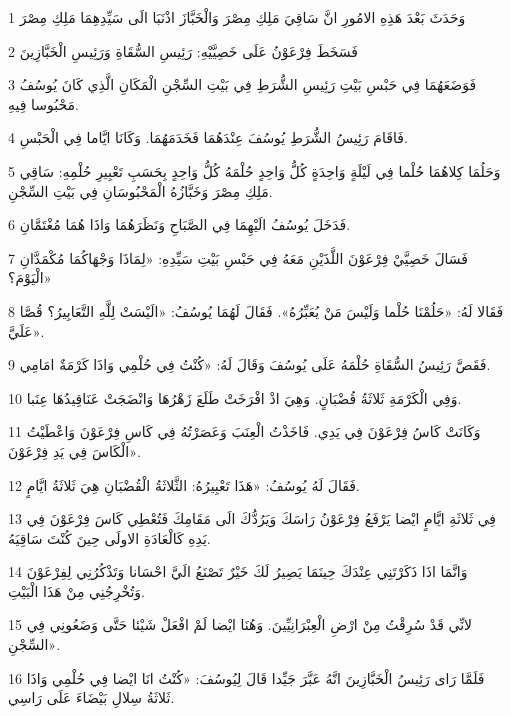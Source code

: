 \par 1 وَحَدَثَ بَعْدَ هَذِهِ الامُورِ انَّ سَاقِيَ مَلِكِ مِصْرَ وَالْخَبَّازَ اذْنَبَا الَى سَيِّدِهِمَا مَلِكِ مِصْرَ
\par 2 فَسَخَطَ فِرْعَوْنُ عَلَى خَصِيَّيْهِ: رَئِيسِ السُّقَاةِ وَرَئِيسِ الْخَبَّازِينَ
\par 3 فَوَضَعَهُمَا فِي حَبْسِ بَيْتِ رَئِيسِ الشُّرَطِ فِي بَيْتِ السِّجْنِ الْمَكَانِ الَّذِي كَانَ يُوسُفُ مَحْبُوسا فِيهِ.
\par 4 فَاقَامَ رَئِيسُ الشُّرَطِ يُوسُفَ عِنْدَهُمَا فَخَدَمَهُمَا. وَكَانَا ايَّاما فِي الْحَبْسِ.
\par 5 وَحَلُمَا كِلاهُمَا حُلْما فِي لَيْلَةٍ وَاحِدَةٍ كُلُّ وَاحِدٍ حُلْمَهُ كُلُّ وَاحِدٍ بِحَسَبِ تَعْبِيرِ حُلْمِهِ: سَاقِي مَلِكِ مِصْرَ وَخَبَّازُهُ الْمَحْبُوسَانِ فِي بَيْتِ السِّجْنِ.
\par 6 فَدَخَلَ يُوسُفُ الَيْهِمَا فِي الصَّبَاحِ وَنَظَرَهُمَا وَاذَا هُمَا مُغْتَمَّانِ.
\par 7 فَسَالَ خَصِيَّيْ فِرْعَوْنَ اللَّذَيْنِ مَعَهُ فِي حَبْسِ بَيْتِ سَيِّدِهِ: «لِمَاذَا وَجْهَاكُمَا مُكْمَدَّانِ الْيَوْمَ؟»
\par 8 فَقَالا لَهُ: «حَلُمْنَا حُلْما وَلَيْسَ مَنْ يُعَبِّرُهُ». فَقَالَ لَهُمَا يُوسُفُ: «الَيْسَتْ لِلَّهِ التَّعَابِيرُ؟ قُصَّا عَلَيَّ».
\par 9 فَقَصَّ رَئِيسُ السُّقَاةِ حُلْمَهُ عَلَى يُوسُفَ وَقَالَ لَهُ: «كُنْتُ فِي حُلْمِي وَاذَا كَرْمَةٌ امَامِي.
\par 10 وَفِي الْكَرْمَةِ ثَلاثَةُ قُضْبَانٍ. وَهِيَ اذْ افْرَخَتْ طَلَعَ زَهْرُهَا وَانْضَجَتْ عَنَاقِيدُهَا عِنَبا.
\par 11 وَكَانَتْ كَاسُ فِرْعَوْنَ فِي يَدِي. فَاخَذْتُ الْعِنَبَ وَعَصَرْتُهُ فِي كَاسِ فِرْعَوْنَ وَاعْطَيْتُ الْكَاسَ فِي يَدِ فِرْعَوْنَ».
\par 12 فَقَالَ لَهُ يُوسُفُ: «هَذَا تَعْبِيرُهُ: الثَّلاثَةُ الْقُضْبَانِ هِيَ ثَلاثَةُ ايَّامٍ.
\par 13 فِي ثَلاثَةِ ايَّامٍ ايْضا يَرْفَعُ فِرْعَوْنُ رَاسَكَ وَيَرُدُّكَ الَى مَقَامِكَ فَتُعْطِي كَاسَ فِرْعَوْنَ فِي يَدِهِ كَالْعَادَةِ الاولَى حِينَ كُنْتَ سَاقِيَهُ.
\par 14 وَانَّمَا اذَا ذَكَرْتَنِي عِنْدَكَ حِينَمَا يَصِيرُ لَكَ خَيْرٌ تَصْنَعُ الَيَّ احْسَانا وَتَذْكُرُنِي لِفِرْعَوْنَ وَتُخْرِجُنِي مِنْ هَذَا الْبَيْتِ.
\par 15 لانِّي قَدْ سُرِقْتُ مِنْ ارْضِ الْعِبْرَانِيِّينَ. وَهُنَا ايْضا لَمْ افْعَلْ شَيْئا حَتَّى وَضَعُونِي فِي السِّجْنِ».
\par 16 فَلَمَّا رَاى رَئِيسُ الْخَبَّازِينَ انَّهُ عَبَّرَ جَيِّدا قَالَ لِيُوسُفَ: «كُنْتُ انَا ايْضا فِي حُلْمِي وَاذَا ثَلاثَةُ سِلالِ بَيْضَاءَ عَلَى رَاسِي.
